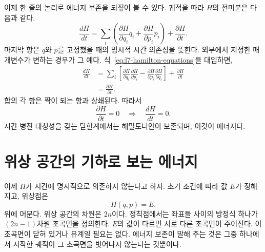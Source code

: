 이제 한 줄의 논리로 에너지 보존을 되짚어 볼 수 있다. 궤적을 따라 \(H\)의 전미분은 다음과 같다.
\begin{equation}
  \frac{dH}{dt}
  =
  \sum_i\left(
    \frac{\partial H}{\partial q_i}\dot q_i
    +\frac{\partial H}{\partial p_i}\dot p_i
  \right)
  +\frac{\partial H}{\partial t}.
  \label{eq:l7-total-h-derivative}
\end{equation}
마지막 항은 \(q\)와 \(p\)를 고정했을 때의 명시적 시간 의존성을 뜻한다. 외부에서 지정한 매개변수가 변하는 경우가 그 예다. 식~\eqref{eq:l7-hamilton-equations}을 대입하면,
\begin{align}
  \frac{dH}{dt}
  &=
  \sum_i\left[
    \frac{\partial H}{\partial q_i}
    \frac{\partial H}{\partial p_i}
    -\frac{\partial H}{\partial p_i}
    \frac{\partial H}{\partial q_i}
  \right]
  +\frac{\partial H}{\partial t}\\
  &=\frac{\partial H}{\partial t}.
  \label{eq:l7-h-energy-rate}
\end{align}
합의 각 항은 짝이 되는 항과 상쇄된다. 따라서
\begin{equation}
  \frac{\partial H}{\partial t}=0
  \quad\Longrightarrow\quad
  \frac{dH}{dt}=0.
  \label{eq:l7-energy-conservation}
\end{equation}
시간 병진 대칭성을 갖는 닫힌계에서는 해밀토니안이 보존되며, 이것이 에너지다.

\begin{classroomqa}
\end{classroomqa}

\section{위상 공간의 기하로 보는 에너지}

이제 \(H\)가 시간에 명시적으로 의존하지 않는다고 하자. 초기 조건에 따라 값 \(E\)가 정해지고, 위상점은 \begin{equation}
  H(q,p)=E.
  \label{eq:l7-energy-surface}
\end{equation} 위에 머문다.
위상 공간의 차원은 \(2n\)이다. 정칙점에서는 좌표들 사이의 방정식 하나가 \((2n-1)\)차원 초곡면을 정의한다. \(E\)의 값이 다르면 서로 다른 초곡면이 주어진다. 이 초곡면이 닫혀 있거나 유계일 필요는 없다. 에너지 보존이 말해 주는 것은 그중 하나에서 시작한 궤적이 그 초곡면을 벗어나지 않는다는 것뿐이다.

